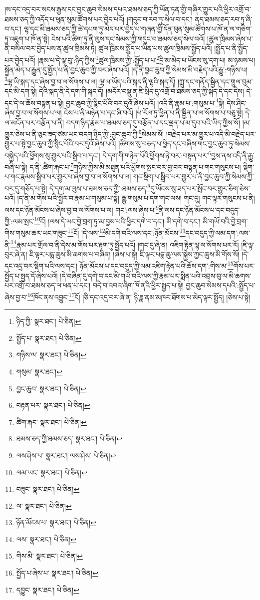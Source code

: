 །ས་དང་འདྲ་བར་སངས་རྒྱས་དང་བྱང་ཆུབ་སེམས་དཔའ་ཐམས་ཅད་ཀྱི་ཡོན་ཏན་གྱི་གཞིར་གྱུར་པའི་ཕྱིར་འགྲོ་བ་ཐམས་ཅད་ཀྱི་འདོད་པ་ཕུན་སུམ་ཚོགས་པར་བྱེད་པའོ། །གདུང་བ་རབ་ཏུ་སེལ་བ་དང་། ནད་ཐམས་ཅད་རབ་ཏུ་ཞི་བ་དང་། ལྷ་དང་མི་ཐམས་ཅད་ཀྱི་ཚེ་དཔག་ཏུ་མེད་པར་བྱེད་པ་གཞན་གྱི་དོན་ཕུན་སུམ་ཚོགས་པ་ཁོ་ན་ལ་གཅིག་ཏུ་འཇུག་པ་ཁོ་ན་སྟེ། ངེས་པའི་ཚིག་ཏུ་ནི་ལུས་དང་སེམས་ཀྱི་གདུང་བ་ཐམས་ཅད་སེལ་བའོ། །ཚུལ་ཁྲིམས་ཞེས་པ་ནི་བསིལ་བར་བྱེད་པས་ན་ཚུལ་ཁྲིམས་ཏེ། ཚུལ་ཁྲིམས་སྤྱོད་པ་ཡིན་པས་ཚུལ་ཁྲིམས་སྤྱོད་པའོ། །སྤྱོད་པ་ནི་སྤྱོད་པར་བྱེད་པའོ། །རྣམ་པ་དེ་ལྟ་བུ་:ཉིད་ཀྱིས་\footnote{ཉིད་ཀྱི་  སྣར་ཐང་།  པེ་ཅིན། }ཚུལ་ཁྲིམས་ཀྱི་:སྤྱོད་པ་པ་\footnote{སྤྱོད་པ་  སྣར་ཐང་།  པེ་ཅིན། }དྲི་མ་མེད་པ་ཡོངས་སུ་དག་པ། མ་ཉམས་པ། སྐྱོན་མེད་པ་རྒྱུན་དུ་སྤྱོད་པ་ནི་བྱང་ཆུབ་ཀྱི་བར་ཞེས་པའོ། །ད་ནི་བྱང་ཆུབ་ཀྱི་སེམས་མི་བརྗེད་པའི་རྒྱུ་:གཉིས་པ། \footnote{གཉིས་ལ་  སྣར་ཐང་།  པེ་ཅིན། }ལྷ་ཡི་སྐད་དང་ཞེས་བྱ་བ་ལ་སོགས་པ་ལ། ལྷ་ལ་ཡོད་པའི་སྐད་ནི་ལྷའི་སྐད་དོ། །ཀླུ་དང་གནོད་སྦྱིན་དང་གྲུལ་བུམ་དང་མི་དག་སྟེ། དེའི་སྐད་ནི་དེ་དག་གི་སྐད་དོ། །མདོར་བསྡུ་ན་ཇི་སྲིད་དུ་འགྲོ་བ་ཐམས་ཅད་ཀྱི་སྐད་དེ་དང་དེས། དེ་དང་དེ་ལ་ཆོས་བསྟན་པ་སྟེ། བྱང་ཆུབ་ཀྱི་སྙིང་པོའི་བར་དུའོ་ཞེས་པའོ། །འདི་ནི་རྣམ་པ་:གསུམ་པ་\footnote{གསུམ་  སྣར་ཐང་། }སྟེ། དེས་ཤིང་ཞེས་བྱ་བ་ལ་སོགས་པ་ལ། ངེས་པ་ནི་མཉེན་པ་དང་ཞི་བའོ། །ཕ་རོལ་ཏུ་ཕྱིན་པ་ནི་སྦྱིན་པ་ལ་སོགས་པ་བཅུ་སྟེ། དེ་ལ་མངོན་པར་བརྩོན་པ་ནི། བདག་ཉིད་རྣམ་པ་ཐམས་ཅད་དུ་བརྩོན་པ་དང་ལྡན་པ་མ་དུབ་པའི་ཡིད་ཀྱིས་སོ། །མ་གྱུར་ཅེས་པ་ནི་ཅུང་ཟད་ཙམ་ཡང་བདག་ཉིད་ཀྱི་:བྱང་ཆུབ་ཀྱི་\footnote{བྱང་ཆུབ་  སྣར་ཐང་།  པེ་ཅིན། }སེམས་སོ། །བརྗེད་པར་མ་གྱུར་པ་འདི་མི་བརྗེད་པར་གྱུར་པ་སྟེ་བྱང་ཆུབ་ཀྱི་སྙིང་པོའི་བར་དུའོ་ཞེས་པའོ། །ཚིགས་སུ་བཅད་པ་ཕྱེད་དང་བཞིས་གང་བྱང་ཆུབ་ཏུ་སེམས་བསྐྱེད་པའི་ཕྱོགས་སུ་གྱུར་པའི་སྒྲིབ་པ་དང་། དེ་དག་གི་གཉེན་པོའི་ཕྱོགས་ཉེ་བར་:བསྟན་པར་\footnote{བརྟན་པར་  སྣར་ཐང་།  པེ་ཅིན། }བྱས་ནས་འདི་ནི་རྒྱུ་བཞི་པ་སྟེ། ད་ནི་:ཚིག་རྐང་པ་\footnote{ཚིག་རྐང་  སྣར་ཐང་།  པེ་ཅིན། }གཉིས་ཀྱིས་མི་མཐུན་པའི་ཕྱོགས་སྤང་བར་བྱ་བར་བསྟན་པ་གང་གསུངས་པ། སྡིག་པ་གང་རྣམས་སྒྲིབ་པར་གྱུར་པ་ཞེས་བྱ་བ་ལ་སོགས་པ་ལ། གང་སྡིག་པ་སྒྲིབ་པར་གྱུར་པ་ནི་བྱང་ཆུབ་ཀྱི་སེམས་ཀྱི་བར་དུ་གཅོད་པ་སྟེ། དེ་དག་མ་ལུས་པ་ཐམས་ཅད་ཀྱི་:ཐམས་ཅད་\footnote{ཐམས་ཅད་ཀྱི་ཐམས་ཅད་  སྣར་ཐང་།  པེ་ཅིན། }དུ་ཡོངས་སུ་ཟད་པར་སྤོང་བར་གྱུར་ཅིག་ཅེས་པའོ། །ད་ནི་མ་གོས་པའི་སྦྱོར་བ་རྣམ་པ་གསུམ་པ་སྟེ། རྒྱུ་གསུམ་པ་དག་གང་ལས། གང་དུ། གང་ལྟར་གསུངས་པ་ནི། ལས་དང་ཉོན་མོངས་པ་ཞེས་བྱ་བ་ལ་སོགས་པ་ལ། གང་:ལས་ཞེས་པ་\footnote{ལས་ཤེས་པ་  སྣར་ཐང་། ལས་ཤེས་  པེ་ཅིན། }ནི་ལས་དང་ཉོན་མོངས་པ་དང་བདུད་ཀྱི་:ལམ་སྤང་\footnote{ལམ་ཡང་  སྣར་ཐང་།  པེ་ཅིན། }ངོ། །ལས་དེ་ཡང་བྱེ་བྲག་ཏུ་མ་བྱས་པའི་ཕྱིར་དགེ་བ་དང་། མི་དགེ་བ་དང་། མི་གཡོ་བའི་བྱེ་བྲག་གིས་གསུམ་ཆར་ཡང་གཟུང་\footnote{བཟུང་  སྣར་ཐང་།  པེ་ཅིན། }ངོ། །དེ་ལས་\footnote{ལ་  སྣར་ཐང་།  པེ་ཅིན། }མི་དགེ་བའི་ལས་དང་:ཉོན་མོངས་\footnote{ཉོན་མོངས་པ་  སྣར་ཐང་།  པེ་ཅིན། }དང་བདུད་ཀྱི་ལམ་དག་:ལས་ནི་\footnote{ལས་  སྣར་ཐང་།  པེ་ཅིན། }རྣམ་པར་གྲོལ་བ་ནི་དེས་མ་གོས་པར་རྟག་ཏུ་སྤྱོད་པའོ། །གང་དུ་ཞེ་ན། འཇིག་རྟེན་ལྷ་ལ་སོགས་པར་རོ། །ཇི་ལྟ་བུར་ཞེ་ན། ཇི་ལྟར་པདྨ་ཆུས་མི་ཆགས་པ་བཞིན། །ཞེས་པ་སྟེ། ཇི་ལྟར་པདྨ་ཆུ་ལས་སྐྱེས་ཀྱང་ཆུས་མི་གོས་སོ། །དེ་དང་འདྲ་བར་སྡིག་པའི་ལས་དང་། ཉོན་མོངས་པ་དང་བདུད་ཀྱི་ལམ་འཇིག་རྟེན་པའི་ཆོས་དག་:གིས་མ་\footnote{གིས་མི་  སྣར་ཐང་།  པེ་ཅིན། }གོས་པར་སྤྱོད་པ་སྤྱད་དོ་ཞེས་པའོ། །དེ་བཞིན་དུ་དགེ་བ་དང་མི་གཡོ་བའི་ལས་ཀྱི་རྣམ་པར་སྨིན་པའི་འབྲས་བུ་ལ་མི་ཆགས་པར་འགྲོ་བ་ཐམས་ཅད་ལ་ཕན་པ་དང་། བདེ་བ་འབའ་ཞིག་ཁོ་ནའི་ཕྱིར་སྤྱད་པ་སྟེ། བྱང་ཆུབ་སེམས་དཔའི་:སྤྱོད་པ་ཞེས་བྱ་བ་\footnote{སྤྱོད་པ་ཞེས་པ་  སྣར་ཐང་།  པེ་ཅིན། }ཁོང་ནས་འབྱུང་\footnote{དབྱུང་  སྣར་ཐང་།  པེ་ཅིན། }ངོ། །ཅི་དང་འདྲ་བར་ཞེ་ན། ཉི་ཟླ་ནམ་མཁར་ཐོགས་པ་མེད་ལྟར་སྤྱོད། །ཅེས་པ་སྟེ། 